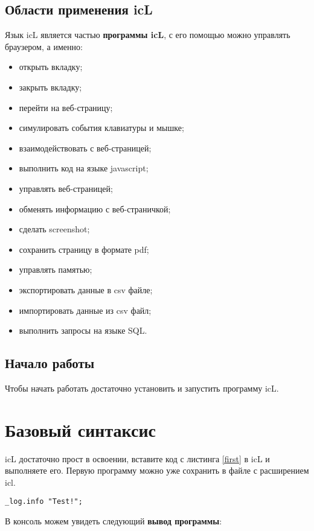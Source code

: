 \documentclass[a4paper, 14pt]{extarticle}
\newenvironment{icItems}
	{ \begin{itemize} [noitemsep,nolistsep] }
	{ \end{itemize} }
\begin{document}
\subsection{Области применения icL}
	
	Язык icL является частью \textbf{программы icL}, с его помощью можно управлять браузером, а именно:
\begin{icItems}
	\item открыть вкладку;
	\item закрыть вкладку;
	\item перейти на веб-страницу;
	\item симулировать события клавиатуры и мышке;
	\item взаимодействовать с веб-страницей;
	\item выполнить код на языке javascript;
	\item управлять веб-страницей;
	\item обменять информацию с веб-страничкой;
	\item сделать screenshot;
	\item сохранить страницу в формате pdf;
	\item управлять памятью;
	\item экспортировать данные в csv файле;
	\item импортировать данные из csv файл;
	\item выполнить запросы на языке SQL.
\end{icItems}
	
\subsection{Начало работы}
	
	Чтобы начать работать достаточно установить и запустить программу icL.
	
\newpage
\section{Базовый синтаксис}
	
	icL достаточно прост в освоении, вставите код с листинга \ref{first} в icL и выполняете его. Первую программу можно уже сохранить в файле с расширением icl.
	
\begin{lstlisting}[caption=Первая программа, label=first]
_log.info "Test!";
\end{lstlisting}
	
	В консоль можем увидеть следующий \textbf{вывод программы}:
	
\end{document}
